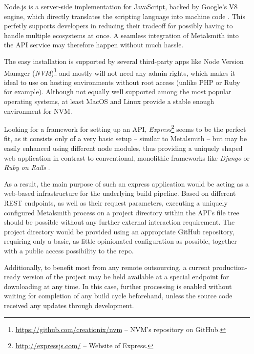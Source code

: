 Node.js is a server-side implementation for JavaScript, backed by Google's V8 engine, which directly translates the scripting language into machine code \cite[4]{cantelon2017node}. This perfetly supports developers in reducing their tradeoff for possibly having to handle multiple ecosystems at once. A seamless integration of Metalsmith into the API service may therefore happen without much hassle.

The easy installation is supported by several third-party apps like Node Version Manager (\emph{NVM})\footnote{\url{https://github.com/creationix/nvm} -- NVM's repository on GitHub.} and mostly will not need any admin rights, which makes it ideal to use on hosting environments without root access (unlike PHP or Ruby for example). Although not equally well supported among the most popular operating systems, at least MacOS and Linux provide a stable enough environment for NVM.

Looking for a framework for setting up an API, \emph{Express}\footnote{\url{http://expressjs.com/} -- Website of Express.} seems to be the perfect fit, as it consists only of a very basic setup -- similar to Metalsmith -- but may be easily enhanced using different node modules, thus providing a uniquely shaped web application in contrast to conventional, monolithic frameworks like \emph{Django} or \emph{Ruby on Rails} \cite[176]{cantelon2017node}.



As a result, the main purpose of such an express application would be acting as a web-based infrastructure for the underlying build pipeline. Based on different REST endpoints, as well as their request parameters, executing a uniquely configured Metalsmith process on a project directory within the API's file tree should be possible without any further external interaction requirement. The project directory would be provided using an appropriate GitHub repository, requiring only a basic, as little opinionated configuration as possible, together with a public access possibility to the repo.

Additionally, to benefit most from any remote outsourcing, a current production-ready version of the project may be held available at a special endpoint for downloading at any time. In this case, further processing is enabled without waiting for completion of any build cycle beforehand, unless the source code received any updates through development.


